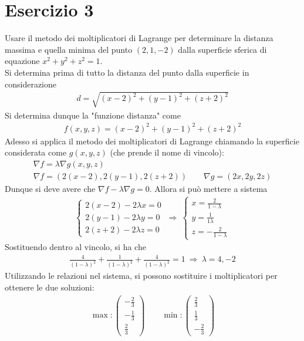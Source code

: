 \documentclass[a4paper, oneside]{book}
\begin{document}
\section{Esercizio 3}
Usare il metodo dei moltiplicatori di Lagrange per determinare la distanza massima e quella minima del punto $(2, 1, -2)$ dalla superficie sferica di equazione $x^{2}+y^{2}+z^{2}=1$. \\
Si determina prima di tutto la distanza del punto dalla superficie in considerazione
\begin{gather*}
    d = \sqrt{(x - 2)^{2} + (y - 1)^{2} + (z + 2)^{2}} 
\end{gather*}
Si determina dunque la "funzione distanza" come
\begin{gather*}
    f(x, y, z) = (x - 2)^{2} + (y - 1)^{2} + (z + 2)^{2}
\end{gather*}
Adesso si applica il metodo dei moltiplicatori di Lagrange chiamando 
la superficie considerata come $g(x, y, z)$ (che prende il nome di vincolo):
\begin{gather*}
    \nabla f = \lambda \nabla g(x, y, z) \\
    \nabla f = (2(x - 2), 2(y - 1), 2(z + 2))  \qquad \nabla g = (2x, 2y, 2z)
\end{gather*}
Dunque si deve avere che $\nabla f - \lambda \nabla g = 0$. Allora si può mettere a sistema
\begin{gather*}
    \left\{\begin{array}{l}
        2(x - 2) - 2\lambda x = 0 \\
        2(y - 1) - 2\lambda y = 0 \\
        2(z + 2) - 2\lambda z = 0
    \end{array}\right. \ \Longrightarrow \ \left\{\begin{array}{l}
        x = \frac{2}{1 - \lambda} \\
        y = \frac{1}{1 \lambda} \\
        z = -\frac{2}{1 - \lambda}
    \end{array}\right.
\end{gather*}
Sostituendo dentro al vincolo, si ha che
\begin{gather*}
    \frac{4}{(1 - \lambda)^{2}} + \frac{1}{(1 - \lambda)^{2}} + \frac{4}{(1 - \lambda)^{2}} = 1  \ \Longrightarrow \ \lambda = 4, -2
\end{gather*}
Utilizzando le relazioni nel sistema, si possono sostituire i moltiplicatori per ottenere le due soluzioni:
\begin{gather*}
    \max : \begin{pmatrix} -\frac{2}{3} \\
    -\frac{1}{3} \\
    \frac{2}{3} \end{pmatrix}  \qquad \min : \begin{pmatrix} \frac{2}{3} \\
    \frac{1}{3} \\
    - \frac{2}{3} \end{pmatrix} 
\end{gather*}
\end{document}
